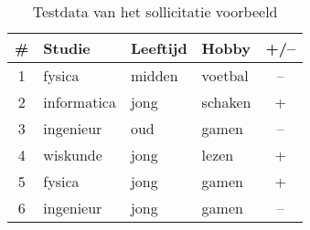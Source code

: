 \begin{table}[htb]
\centering
\begin{tabular}{c|l|l|l|c}
\#&Studie&Leeftijd&Hobby&+/--\\\hline
1&fysica&midden&voetbal&--\\
2&informatica&jong&schaken&+\\
3&ingenieur&oud&gamen&--\\
4&wiskunde&jong&lezen&+\\
5&fysica&jong&gamen&+\\
6&ingenieur&jong&gamen&--
\end{tabular}
\caption{Testdata van het sollicitatie voorbeeld}
\label{tbl:sollicitatieTestData}
\end{table}
